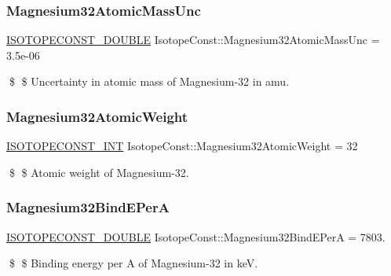 \subsubsection{\texorpdfstring{Magnesium32\+Atomic\+Mass\+Unc}{Magnesium32AtomicMassUnc}}
{\footnotesize\ttfamily \mbox{\hyperlink{group___isotope_const-_macros_ga8f45a7272ce02c0b4c65c44636ed719a}{I\+S\+O\+T\+O\+P\+E\+C\+O\+N\+S\+T\+\_\+\+D\+O\+U\+B\+LE}} Isotope\+Const\+::\+Magnesium32\+Atomic\+Mass\+Unc = 3.\+5e-\/06}

\$ \$ Uncertainty in atomic mass of Magnesium-\/32 in amu. \mbox{\label{group___isotope_const-_magnesium-_mg32_ga793176bdd99c8a17860416ab58b39f6a}} 
\subsubsection{\texorpdfstring{Magnesium32\+Atomic\+Weight}{Magnesium32AtomicWeight}}
{\footnotesize\ttfamily \mbox{\hyperlink{group___isotope_const-_macros_ga5f18360b3e99483a35c32d789e62621c}{I\+S\+O\+T\+O\+P\+E\+C\+O\+N\+S\+T\+\_\+\+I\+NT}} Isotope\+Const\+::\+Magnesium32\+Atomic\+Weight = 32}

\$ \$ Atomic weight of Magnesium-\/32. \mbox{\label{group___isotope_const-_magnesium-_mg32_ga6109ac9239b40f6bc41c2a6cae8884e1}} 
\subsubsection{\texorpdfstring{Magnesium32\+Bind\+E\+PerA}{Magnesium32BindEPerA}}
{\footnotesize\ttfamily \mbox{\hyperlink{group___isotope_const-_macros_ga8f45a7272ce02c0b4c65c44636ed719a}{I\+S\+O\+T\+O\+P\+E\+C\+O\+N\+S\+T\+\_\+\+D\+O\+U\+B\+LE}} Isotope\+Const\+::\+Magnesium32\+Bind\+E\+PerA = 7803.}

\$ \$ Binding energy per A of Magnesium-\/32 in keV. \mbox{\label{group___isotope_const-_magnesium-_mg32_ga96d9fdf81593577757bc50bbb2c805f2}} 

